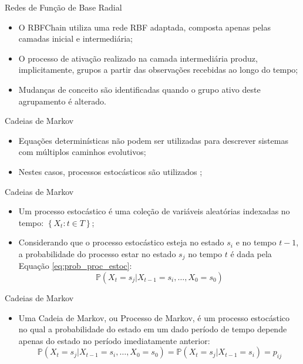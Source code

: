 \documentclass[10pt]{beamer}
\begin{document}
\begin{frame}{Redes de Função de Base Radial}
    \begin{itemize}
        \item<1 -> O RBFChain utiliza uma rede RBF adaptada, composta apenas pelas camadas inicial e intermediária;
        \item<2 -> O processo de ativação realizado na camada intermediária produz, implicitamente, grupos a partir das observações recebidas ao longo do tempo;
        \item<3 -> Mudanças de conceito são identificadas quando o grupo ativo deste agrupamento é alterado.
      \end{itemize}
\end{frame}


\begin{frame}{Cadeias de Markov}
    \begin{itemize}
        \item<1 -> Equações determinísticas não podem ser utilizadas para descrever sistemas com múltiplos caminhos evolutivos;
        \item<2 -> Nestes casos, \alert{processos estocásticos} são utilizados \cite{taylor1998introduction};
      \end{itemize}
\end{frame}

\begin{frame}{Cadeias de Markov}
    \begin{itemize}
        \item<1 -> Um \alert{processo estocástico} é uma coleção de variáveis aleatórias indexadas no tempo: $\left\{ X _ { t } : t \in T \right\}$;
        \item<2 -> Considerando que o processo estocástico esteja no estado $s_i$ e no tempo $t - 1$, a probabilidade
        do processo estar no estado $s_j$ no tempo $t$ é dada pela Equação \ref{eq:prob_proc_estoc}:
        \begin{equation}
            \label{eq:prob_proc_estoc}
            \mathbb { P } \left( X _ { t } = s _ { j } | X _ { t - 1 } = s _ { i } , \ldots , X _ { 0 } = s _ { 0 } \right)
        \end{equation}
      \end{itemize}
\end{frame}

\begin{frame}{Cadeias de Markov}
    \begin{itemize}
        \item<1 -> Uma \alert{Cadeia de Markov}, ou \alert{Processo de Markov}, é um processo estocástico no qual a probabilidade do estado em um dado período de tempo depende apenas do estado no período imediatamente anterior:
        \begin{equation}
            \label{eq:markov}
            \mathbb { P } \left( X _ { t } = s _ { j } | X _ { t - 1 } = s _ { i } , \ldots , X _ { 0 } = s _ { 0 } \right) = \mathbb { P } \left( X _ { t } = s _ { j } | X _ { t - 1 } = s _ { i } \right) = p _ { i j }
        \end{equation}
      \end{itemize}
\end{frame}
\end{document}
